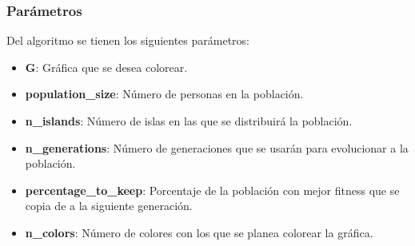 \documentclass{article}
\begin{document}
\subsubsection{Parámetros}
Del algoritmo se tienen los siguientes parámetros:
\begin{itemize}
    \item \textbf{G}: Gráfica que se desea colorear.
    \item \textbf{population\_size}: Número de personas en la población.
    \item \textbf{n\_islands}: Número de islas en las que se distribuirá la población.
    \item \textbf{n\_generations}: Número de generaciones que se usarán para evolucionar a la población.
    \item \textbf{percentage\_to\_keep}: Porcentaje de la población con mejor fitness que se copia de a la siguiente generación. 
    \item \textbf{n\_colors}: Número de colores con los que se planea colorear la gráfica.
\end{itemize}
\end{document}
